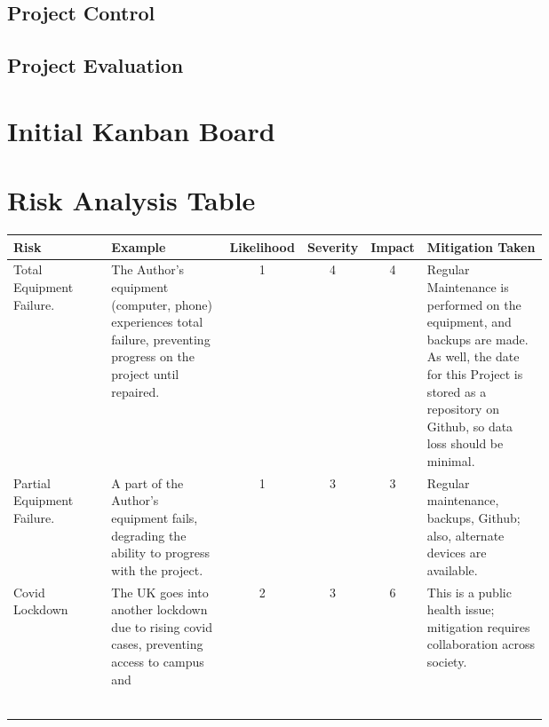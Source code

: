 \documentclass[11pt, a4paper, notitlepage]{report}
\begin{document}
\section{Project Control}
\section{Project Evaluation}

\appendix
\chapter{Initial Kanban Board}\label{app:KanBan}
\chapter{Risk Analysis Table}\label{app:RiskAnalysis}
\begin{tabular}{|p{0.2\linewidth}|p{0.25\linewidth}|c|c|c|p{0.25\linewidth}|}
	\hline
	\small Risk & \small Example & \small Likelihood & \small Severity & \small 
	Impact 
	& \small Mitigation Taken \\
	\hline
	\small Total Equipment Failure. & \small The Author's equipment (computer, 
	phone) 
	experiences total failure, preventing progress on the project until 
	repaired. & 1 & 4 & 4 & \small Regular Maintenance is performed on the 
	equipment, and backups are made. As well, the date for this Project is 
	stored as a repository on Github, so data loss should be minimal. \\
	
	\small Partial Equipment Failure. & \small A part of the Author's equipment 
	fails, degrading the ability to progress with the project. & 1 & 3 & 3 & 
	\small Regular maintenance, backups, Github; also, alternate devices are 
	available. \\
	
	\small Covid Lockdown & The UK goes into another lockdown due to rising 
	covid cases, preventing access to campus and  & 2 & 3 & 6 & This is a 
	public health issue; mitigation requires collaboration across society.\\
	
	&  &  &  &  &  \\
	
	&  &  &  &  &  \\
	
	&  &  &  &  &  \\
	
	&  &  &  &  &  \\
	
	&  &  &  &  &  \\

	&  &  &  &  &  \\
	\hline
\end{tabular}
\end{document}
